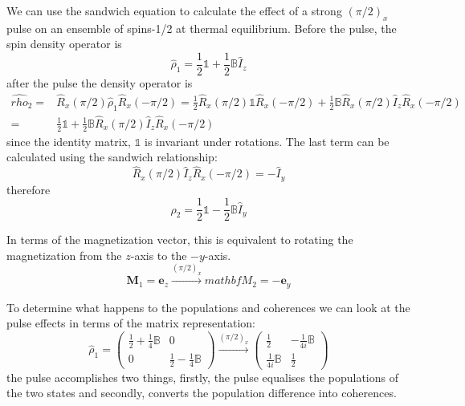 We can use the sandwich equation to calculate the effect of a strong $(\pi/2)_x$ pulse
on an ensemble of spins-1/2 at thermal equilibrium.
Before the pulse, the spin density operator is
\begin{equation}
  \hat{\rho}_1 = \frac{1}{2}\mathbb{1} + \frac{1}{2}\mathbb{B}\hat{I}_z
\end{equation}
after the pulse the density operator is
\begin{align}
  \hat{rho}_2 =& \hat{R}_x(\pi/2)\hat{\rho}_1\hat{R}_x(-\pi/2) = \frac{1}{2}\hat{R}_x(\pi/2)\mathbb{1}\hat{R}_x(-\pi/2) + \frac{1}{2}\mathbb{B}\hat{R}_x(\pi/2)\hat{I}_z\hat{R}_x(-\pi/2) \\
  =& \frac{1}{2}\mathbb{1} + \frac{1}{2}\mathbb{B}\hat{R}_x(\pi/2)\hat{I}_z\hat{R}_x(-\pi/2)
\end{align}
since the identity matrix, $\mathbb{1}$ is invariant under rotations. The last term
can be calculated using the sandwich relationship:
\begin{equation}
  \hat{R}_x(\pi/2)\hat{I}_z\hat{R}_x(-\pi/2) = -\hat{I}_y
\end{equation}
therefore
\begin{equation}
  \hat{\rho}_2 = \frac{1}{2}\mathbb{1} - \frac{1}{2}\mathbb{B}\hat{I}_y
\end{equation}

In terms of the magnetization vector, this is equivalent to rotating
the magnetization from the $z$-axis to the $-y$-axis.
\begin{equation}
  \mathbf{M}_1 = \mathbf{e}_z \xrightarrow{(\pi/2)_x} mathbf{M}_2 = -\mathbf{e}_y
\end{equation}

To determine what happens to the populations and coherences we can look at the
pulse effects in terms of the matrix representation:
\begin{equation}
  \hat{\rho}_1 = \begin{pmatrix}
    \frac{1}{2} + \frac{1}{4}\mathbb{B} & 0\\
    0 & \frac{1}{2} - \frac{1}{4}\mathbb{B}
\end{pmatrix}\xrightarrow{(\pi/2)_x}\begin{pmatrix}
  \frac{1}{2} & -\frac{1}{4i}\mathbb{B}\\
  \frac{1}{4i}\mathbb{B} & \frac{1}{2}
\end{pmatrix}
\end{equation}
the pulse accomplishes two things, firstly, the pulse equalises the populations of the
two states and secondly, converts the population difference into coherences.

